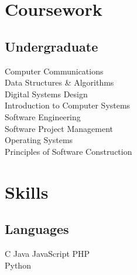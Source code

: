\documentclass[]{constants}
\begin{document}
\begin{minipage}[t]{0.30\textwidth}

\section{Coursework}
\subsection{Undergraduate}
Computer Communications \\
Data Structures \& Algorithms \\
Digital Systems Design \\
Introduction to Computer Systems \\
Software Engineering \\
Software Project Management \\
Operating Systems \\
Principles of Software Construction \\
\sectionsep


\section{Skills}
\subsection{Languages}
C \textbullet{} 
Java \textbullet{}
JavaScript \textbullet{}
PHP \\ \textbullet{}
Python
\newline



\end{minipage}
\end{document}
